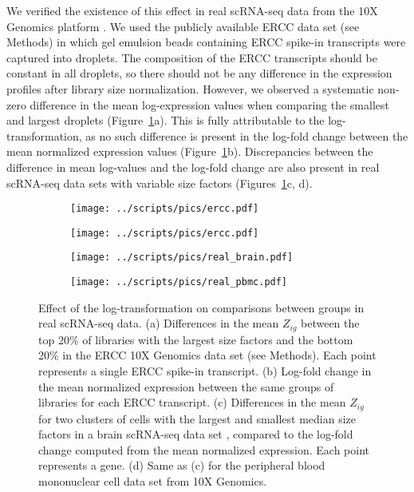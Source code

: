 \documentclass[10pt,letterpaper]{article}
\begin{document}
We verified the existence of this effect in real scRNA-seq data from the 10X Genomics platform \cite{zheng2017massively}.
We used the publicly available ERCC data set (see Methods) in which gel emulsion beads containing ERCC spike-in transcripts were captured into droplets.
The composition of the ERCC transcripts should be constant in all droplets, so there should not be any difference in the expression profiles after library size normalization.
However, we observed a systematic non-zero difference in the mean log-expression values when comparing the smallest and largest droplets (Figure~\ref{fig:ercc}a).
This is fully attributable to the log-transformation, as no such difference is present in the log-fold change between the mean normalized expression values (Figure~\ref{fig:ercc}b).
Discrepancies between the difference in mean log-values and the log-fold change are also present in real scRNA-seq data sets with variable size factors (Figures~\ref{fig:ercc}c, d).

\begin{figure}
\centering
\begin{subfigure}[b]{0.49\textwidth}
    \texttt{[image: ../scripts/pics/ercc.pdf]}
    \caption{}
\end{subfigure}
\begin{subfigure}[b]{0.49\textwidth}
    \texttt{[image: ../scripts/pics/ercc.pdf]}
    \caption{}
\end{subfigure}
\begin{subfigure}[b]{0.49\textwidth}
    \texttt{[image: ../scripts/pics/real\_brain.pdf]}
    \caption{}
\end{subfigure}
\begin{subfigure}[b]{0.49\textwidth}
    \texttt{[image: ../scripts/pics/real\_pbmc.pdf]}
    \caption{}
\end{subfigure}
\caption{Effect of the log-transformation on comparisons between groups in real scRNA-seq data.
(a) Differences in the mean $Z_{ig}$ between the top 20\% of libraries with the largest size factors and the bottom 20\% in the ERCC 10X Genomics data set (see Methods).
Each point represents a single ERCC spike-in transcript.
(b) Log-fold change in the mean normalized expression between the same groups of libraries for each ERCC transcript.
(c) Differences in the mean $Z_{ig}$ for two clusters of cells with the largest and smallest median size factors in a brain scRNA-seq data set \cite{zeisel2015brain},
compared to the log-fold change computed from the mean normalized expression.
Each point represents a gene.
(d) Same as (c) for the peripheral blood mononuclear cell data set from 10X Genomics.
}

\label{fig:ercc}
\end{figure}
\end{document}
